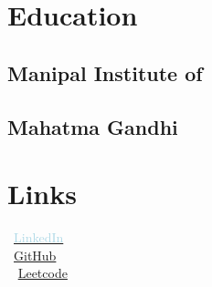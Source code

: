 \documentclass[]{deedy-resume-openfont}
\begin{document}
%
%

%
%

%
%

\begin{minipage}[t]{0.33\textwidth} 


\section{Education} 
\subsection{Manipal Institute of } 
\vspace{4mm}
\subsection{Mahatma Gandhi } 
\sectionsep


\section{Links}
\faLinkedin\ \quad  \href{https://www.linkedin.com/in/rakeshkundar/}{\textcolor{lightblue}{LinkedIn}}\\
\faGithub\ \quad  \href{https://github.com/rakeshkundar}{GitHub} \\
\faPaperclip\ \quad 
 \href{https://leetcode.com/rakeshkundar}{Leetcode} \\ 
\sectionsep



\end{minipage}
\end{document}
